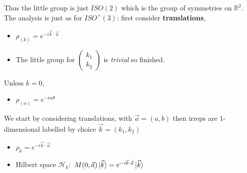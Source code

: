 Thus the little group is just $ISO(2)$ which is the group of symmetries on $\mathbb{R}^2$. The analysis is just as for $ISO^+(3)$: first consider \textbf{translations},
\begin{itemize}
    \item $\rho_{(k)} = e^{-i\vec{k}\cdot\vec{a}}$
    \item The little group for $\begin{pmatrix}
        k_1\\k_2
    \end{pmatrix}$ is \textit{trivial} so finished.
\end{itemize}
Unless $k=0$,
\begin{itemize}
    \item $\rho_{(\alpha)} = e^{-i\alpha\theta}$
\end{itemize}
We start by considering translations, with $\vec{a} = (a,b)$ then irreps are $1$-dimensional labelled by choice $\vec{k} = (k_1,k_2)$
\begin{itemize}
    \item $\rho_k = e^{-i\vec{k}\cdot\vec{a}}$
    \item Hilbert space $\mathcal{H}_k:$ $M(0,\vec{a})\ket{\vec{k}} = e^{-i\vec{k}\cdot\vec{a}}\ket{\vec{k}}$
\end{itemize}

